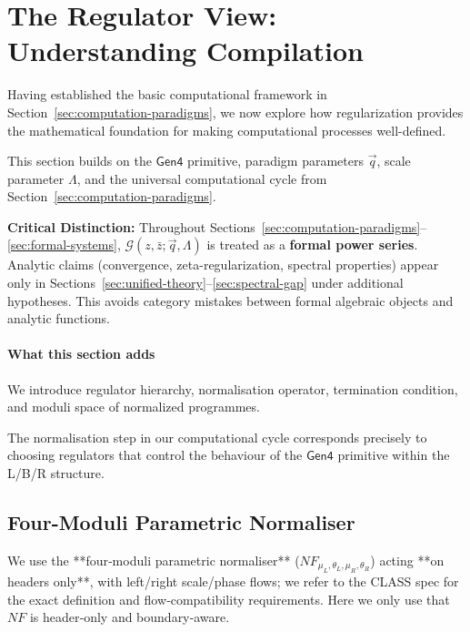 \section{The Regulator View: Understanding Compilation}
\label{sec:regularization}

Having established the basic computational framework in Section~\ref{sec:computation-paradigms}, we now explore how regularization provides the mathematical foundation for making computational processes well-defined.

This section builds on the $\mathsf{Gen4}$ primitive, paradigm parameters $\vec{q}$, scale parameter $\Lambda$, and the universal computational cycle from Section~\ref{sec:computation-paradigms}.

\begin{notation}
\label{not:formal-analytic}
\textbf{Critical Distinction:} Throughout Sections~\ref{sec:computation-paradigms}--\ref{sec:formal-systems}, $\mathcal{G}(z,\bar{z};\vec{q},\Lambda)$ is treated as a \textbf{formal power series}. Analytic claims (convergence, zeta-regularization, spectral properties) appear only in Sections~\ref{sec:unified-theory}--\ref{sec:spectral-gap} under additional hypotheses. This avoids category mistakes between formal algebraic objects and analytic functions.
\end{notation}

\paragraph{What this section adds}
We introduce regulator hierarchy, normalisation operator, termination condition, and moduli space of normalized programmes.

The normalisation step in our computational cycle corresponds precisely to choosing regulators that control the behaviour of the $\mathsf{Gen4}$ primitive within the L/B/R structure.

\subsection{Four-Moduli Parametric Normaliser}

We use the **four‑moduli parametric normaliser** ($NF_{\mu_L,\theta_L,\mu_R,\theta_R}$) acting **on headers only**, with left/right scale/phase flows; we refer to the CLASS spec for the exact definition and flow‑compatibility requirements. Here we only use that $NF$ is header‑only and boundary‑aware.

